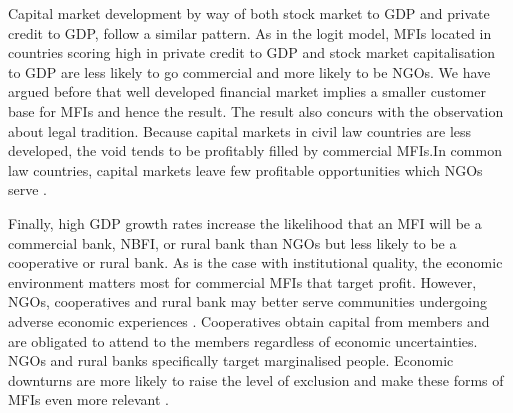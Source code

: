 \documentclass[a4paper,nobind]{templates/ociamthesis}
\begin{document}
Capital market development by way of both stock market to GDP and private credit to GDP, follow a similar pattern. As in the logit model, MFIs located in countries scoring high in private credit to GDP and stock market capitalisation to GDP are less likely to go commercial and more likely to be NGOs. We have argued before that well developed financial market implies a smaller customer base for MFIs and hence the result. The result also concurs with the observation about legal tradition. Because capital markets in civil law countries are less developed, the void tends to be profitably filled by commercial MFIs.In common law countries, capital markets leave few profitable opportunities which NGOs serve \autocite{d2013unsubsidized,armendariz2013subsidy}.

Finally, high GDP growth rates increase the likelihood that an MFI will be a commercial bank, NBFI, or rural bank than NGOs but less likely to be a cooperative or rural bank. As is the case with institutional quality, the economic environment matters most for commercial MFIs that target profit. However, NGOs, cooperatives and rural bank may better serve communities undergoing adverse economic experiences \autocite{ghosh2013microfinance}. Cooperatives obtain capital from members and are obligated to attend to the members regardless of economic uncertainties. NGOs and rural banks specifically target marginalised people. Economic downturns are more likely to raise the level of exclusion and make these forms of MFIs even more relevant \autocite{schnyder2018twenty}.
\end{document}
